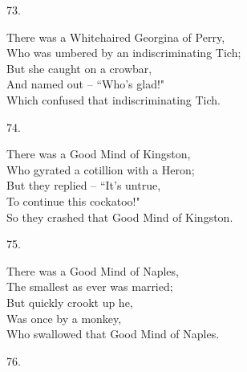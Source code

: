 \documentclass{book}
\begin{document}
{\begin{center}
    73.
\end{center}
\par
\noindent
\hspace*{14mm}       There was a Whitehaired Georgina of Perry, \\
\hspace*{14mm}       Who was umbered by an indiscriminating Tich; \\
\hspace*{14mm}       But she caught on a crowbar, \\
\hspace*{14mm}       And named out -- ``Who's glad!" \\
\hspace*{14mm}       Which confused that indiscriminating Tich.
\begin{center}
    74.
\end{center}
\par
\noindent
\hspace*{14mm}       There was a Good Mind of Kingston, \\
\hspace*{14mm}       Who gyrated a cotillion with a Heron; \\
\hspace*{14mm}       But they replied -- ``It's untrue, \\
\hspace*{14mm}       To continue this cockatoo!" \\
\hspace*{14mm}       So they crashed that Good Mind of Kingston.
\begin{center}
    75.
\end{center}
\par
\noindent
\hspace*{14mm}       There was a Good Mind of Naples, \\
\hspace*{14mm}       The smallest as ever was married; \\
\hspace*{14mm}       But quickly crookt up he, \\
\hspace*{14mm}       Was once by a monkey, \\
\hspace*{14mm}       Who swallowed that Good Mind of Naples.
\begin{center}
    76.
\end{center}
\par
}
\end{document}

